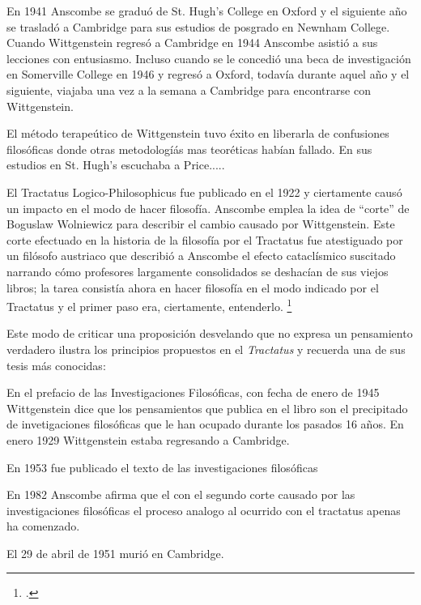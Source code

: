 En 1941 Anscombe se graduó de St. Hugh's College en Oxford y el siguiente año se
trasladó a Cambridge para sus estudios de posgrado en Newnham College. Cuando
Wittgenstein regresó a Cambridge en 1944 Anscombe asistió a sus lecciones con
entusiasmo. Incluso cuando se le concedió una beca de investigación en
Somerville College en 1946 y regresó a Oxford, todavía durante aquel año y el
siguiente, viajaba una vez a la semana a Cambridge para encontrarse con
Wittgenstein.  

El método terapeútico de Wittgenstein tuvo éxito en liberarla de confusiones
filosóficas donde otras metodologíás mas teoréticas habían fallado. En sus
estudios en St. Hugh's escuchaba a Price.....




El Tractatus Logico-Philosophicus fue publicado en el 1922 y ciertamente causó
un impacto en el modo de hacer filosofía. Anscombe emplea la idea de ``corte''
de Boguslaw Wolniewicz para describir el cambio causado por Wittgenstein. Este
corte efectuado en la historia de la filosofía por el Tractatus fue atestiguado
por un filósofo austriaco que describió a Anscombe el efecto cataclísmico
suscitado narrando cómo profesores largamente consolidados se deshacían de sus
viejos libros; la tarea consistía ahora en hacer filosofía en el modo indicado
por el Tractatus y el primer paso era, ciertamente, entenderlo.
\footcite[p.181]{twocuts} 


Este modo de criticar una proposición desvelando que no expresa un pensamiento
verdadero ilustra los principios propuestos en el \emph{Tractatus} y recuerda
una de sus tesis más conocidas: 



En el prefacio de las Investigaciones Filosóficas, con fecha de enero de 1945
Wittgenstein dice que los pensamientos que publica en el libro son el
precipitado de invetigaciones filosóficas que le han ocupado durante los pasados
16 años. En enero 1929 Wittgenstein estaba regresando a Cambridge.

En 1953 fue publicado el texto de las investigaciones filosóficas

En 1982 Anscombe afirma que el con el segundo corte causado por las
investigaciones filosóficas el proceso analogo al ocurrido con el tractatus
apenas ha comenzado.

El 29 de abril de 1951 murió en Cambridge. 

